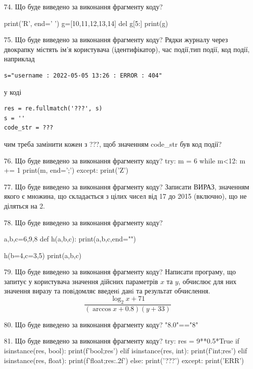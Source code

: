 \documentclass[11pt]{article}
\begin{document}
74. Що буде виведено за виконання фрагменту коду?

print('R', end=' ')
g=[10,11,12,13,14]
del g[5:]
print(g)



75. Що буде виведено за виконання фрагменту коду?
Рядки журналу через двокрапку містять ім'я користувача (ідентифікатор), час події,тип події, код події, наприклад
\begin{verbatim}
s="username : 2022-05-05 13:26 : ERROR : 404"
\end{verbatim}
у коді 
\begin{verbatim}
res = re.fullmatch('???', s) 
s = ''
code_str = ??? 
\end{verbatim}
чим треба замінити кожен з ???, щоб значенням code\_str був код події? 




76. Що буде виведено за виконання фрагменту коду?
try:
    m = 6
    while m<12:
        m += 1
    print(m, end=';')
except:
    print('Z')


77. Що буде виведено за виконання фрагменту коду?
Записати ВИРАЗ, значенням якого є множина, що складається з цілих чисел від 17 до 2015 (включно), що не діляться на 2.

78. Що буде виведено за виконання фрагменту коду?

a,b,c=6,9,8
def h(a,b,c):
    print(a,b,c,end="")

h(b=4,c=3,5)
print(a,b,c)



79. Що буде виведено за виконання фрагменту коду?
Написати програму, що запитує у користувача значення дійсних параметрів $x$ та $y$, обчислює для них значення виразу та повiдомляє введенi данi та результат обчислення.
$$\frac{\log_{2} x + 71}{(\arccos x + 0.8) (y + 33)}$$ 



80. Що буде виведено за виконання фрагменту коду?
"8.0"=="8"

81. Що буде виведено за виконання фрагменту коду?
try:
    res = 9**0.5*True
    if isinstance(res, bool):
        print(f'bool;{res}')
    elif isinstance(res, int):
        print(f'int;{res}')
    elif isinstance(res, float):
        print(f'float;{res:.2f}')
    else:
        print('???')
except:
    print('ERR')
\end{document}
